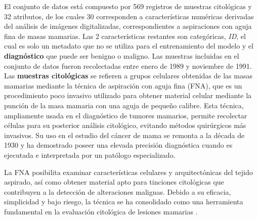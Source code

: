 \documentclass[a4paper,10pt]{book}
\begin{document}
El conjunto de datos está compuesto por 569 registros de muestras citológicas y 32 atributos, de los cuales 30 corresponden a características numéricas derivadas del análisis de imágenes digitalizadas, correspondientes a aspiraciones con aguja fina de masas mamarias. Las 2 características restantes son categóricas, \emph{ID}, el cual es solo un metadato que no se utiliza para el entrenamiento del modelo y el \textbf{diagnóstico} que puede ser benigno o maligno. Las muestras incluidas en el conjunto de datos fueron recolectadas entre enero de 1989 y noviembre de 1991.\\

Las \textbf{muestras citológicas} se refieren a grupos celulares obtenidas de las masas mamarias mediante la técnica de aspiración con aguja fina (FNA), que es un procedimiento poco invasivo utilizado para obtener material celular mediante la punción de la masa mamaria con una aguja de pequeño calibre. Esta técnica, ampliamente usada en el diagnóstico de tumores mamarios, permite recolectar células para su posterior análisis citológico, evitando métodos quirúrgicos más invasivos. Su uso en el estudio del cáncer de mama se remonta a la década de 1930 y ha demostrado poseer una elevada precisión diagnóstica cuando es ejecutada e interpretada por un patólogo especializado.

La FNA posibilita examinar características celulares y arquitectónicas del tejido aspirado, así como obtener material apto para tinciones citológicas que contribuyen a la detección de alteraciones malignas. Debido a su eficacia, simplicidad y bajo riesgo, la técnica se ha consolidado como una herramienta fundamental en la evaluación citológica de lesiones mamarias \cite{diamantis2009fine}.\\
\end{document}
